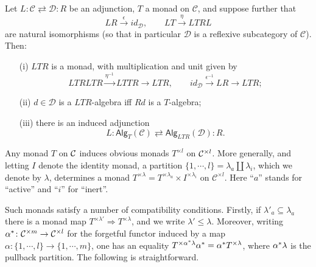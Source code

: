 \documentclass[a4paper,10pt]{article}%
\begin{document}
\begin{proposition}\label{MONADADJ PROP}
Let
$
L \colon \mathcal{C} \rightleftarrows \mathcal{D} \colon R
$
be an adjunction, $T$ a monad on $\mathcal{C}$, and suppose further that
\[
	LR \xrightarrow{\epsilon} id_{\mathcal{D}}, 
\qquad
	LT \xrightarrow{\eta} LTRL
\]
are natural isomorphisms 
(so that in particular $\mathcal{D}$ is a reflexive subcategory of $\mathcal{C}$).
Then:
\begin{itemize}
\item[(i)] $LTR$ is a monad, with multiplication and unit given by
\[LTRLTR \xrightarrow{\eta^{-1}} LTTR \to LTR,\qquad
id_{\mathcal{D}} \xrightarrow{\epsilon^{-1}} LR \to LTR;
\]
\item[(ii)]
$d \in \mathcal{D}$ is a $LTR$-algebra iff $Rd$ is a $T$-algebra;
\item[(iii)] there is an induced adjunction
\[
L \colon \mathsf{Alg}_{T}(\mathcal{C})
	\rightleftarrows
\mathsf{Alg}_{LTR}(\mathcal{D}) \colon R.
\]
\end{itemize}
\end{proposition}



Any monad $T$ on $\mathcal{C}$ induces obvious monads $T^{\times l}$ on $\mathcal{C}^{\times l}$.
More generally, and 
letting $I$ denote the identity monad,
a partition 
$\{1,\cdots,l\} = \lambda_a \amalg \lambda_i$,
which we denote by $\lambda$,
determines a monad 
$T^{\times \lambda} = T^{\times \lambda_a} \times I^{\times \lambda_i}$ on $\mathcal{C}^{\times l}$.
Here ``$a$'' stands for ``active'' and ``$i$'' for ``inert''.

Such monads satisfy a number of compatibility conditions. 
Firstly, if $\lambda'_a \subseteq \lambda_a$
there is a monad map
$T^{\times \lambda'} \Rightarrow T^{\times \lambda}$,
and we write $\lambda' \leq \lambda$.
Moreover, writing $\alpha^{\**} \colon 
\C^{\times m} \to \C^{\times l}$
for the forgetful functor induced by
a map $\alpha \colon \{1,\cdots,l\} \to \{1,\cdots,m\}$,
one has an equality
$T^{\times \alpha^{\**}\lambda} \alpha^{\**} =
\alpha^{\**} T^{\times \lambda}$,
where $\alpha^{\**}\lambda$ is the pullback partition.
The following is straightforward.
\end{document}
